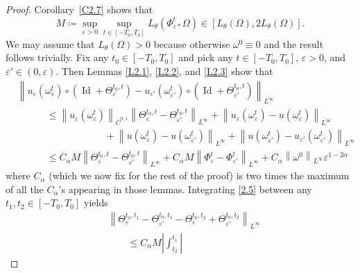 \documentclass[reqno,centertags,12pt]{amsart}
\theoremstyle{definition}
\numberwithin{equation}{section}
\newcommand{\abs}[1]{\left\lvert#1\right\rvert}
\newcommand{\norm}[1]{\left\|#1\right\|}
\newcommand{\eps}{\varepsilon}
\newcommand{\tht}{\theta}
\begin{document}
\begin{proof}
    Corollary~\ref{C2.7} shows that
    \[
        M\coloneqq \sup_{\eps>0}\sup_{t\in[-T_{0},T_{0}]}L_{\tht}(\Phi_{\eps*}^{t}\Omega)
        \in [L_{\tht}(\Omega), 2L_{\tht}(\Omega)] .
    \]
    We may assume that $L_{\tht}(\Omega) > 0$ because otherwise $\omega^{0} \equiv 0$
    and the result follows trivially.
    Fix any $t_{0}\in[-T_{0},T_{0}]$ and pick any $t\in[-T_{0},T_{0}]$, $\eps>0$, and
    $\eps'\in(0,\eps)$.  Then Lemmas \ref{L2.1}, \ref{L2.2}, and \ref{L2.3} show that
    \begin{equation}\label{2.5}
        \begin{aligned}
            &\norm{u_{\eps}(\omega_{\eps}^{t})\circ
            (\operatorname{Id} + \Theta_{\eps}^{t_{0},t})
            - u_{\eps'}(\omega_{\eps'}^{t})\circ
            (\operatorname{Id} + \Theta_{\eps'}^{t_{0},t})}_{L^{\infty}}
            \\&\quad\quad\quad
            \leq \norm{u_{\eps}(\omega_{\eps}^{t})}_{\dot{C}^{0,1}}
            \norm{\Theta_{\eps}^{t_{0},t} - \Theta_{\eps'}^{t_{0},t}}_{L^{\infty}}
             + \norm{u_{\eps}(\omega_{\eps}^{t})
            - u(\omega_{\eps}^{t})}_{L^{\infty}}
            \\&\quad\quad\quad\quad\quad\quad\quad\quad\quad
           + \norm{u(\omega_{\eps}^{t})
            - u(\omega_{\eps'}^{t})}_{L^{\infty}}
            + \norm{u(\omega_{\eps'}^{t})
            - u_{\eps'}(\omega_{\eps'}^{t})}_{L^{\infty}}
            \\&\quad\quad\quad
            \leq C_{\alpha}M
            \norm{\Theta_{\eps}^{t_{0},t} - \Theta_{\eps'}^{t_{0},t}}_{L^{\infty}}
            + C_{\alpha}M
            \norm{\Phi_{\eps}^{t} - \Phi_{\eps'}^{t}}_{L^{\infty}}
            + C_{\alpha}\norm{\omega^{0}}_{L^{\infty}} \eps^{1-2\alpha}
        \end{aligned}
    \end{equation}
    where $C_{\alpha}$ (which we now fix for the rest of the proof)
    is two times the maximum of all the $C_{\alpha}$'s appearing in those lemmas.
    Integrating \eqref{2.5} between any $t_{1},t_{2}\in[-T_{0},T_{0}]$ yields
    \begin{equation}\label{2.6}
        \begin{aligned}
            &\norm{\Theta_{\eps}^{t_{0},t_{1}} - \Theta_{\eps'}^{t_{0},t_{1}}
            - \Theta_{\eps}^{t_{0},t_{2}} + \Theta_{\eps'}^{t_{0},t_{2}}}_{L^{\infty}}
            \\&\quad\quad
            \leq C_{\alpha}M\abs{\int_{t_{2}}^{t_{1}}
}
\end{aligned}
\end{equation}
\end{proof}
\end{document}
